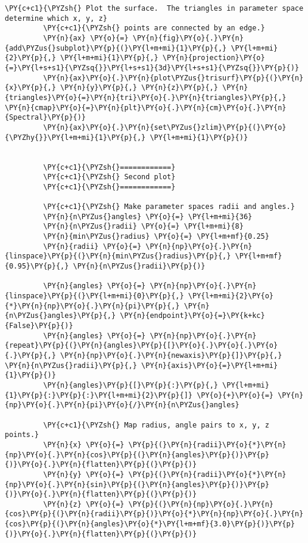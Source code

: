 \begin{Verbatim}[commandchars=\\\{\},frame=single,framerule=0.3mm,rulecolor=\color{cellframecolor}]
         \PY{c+c1}{\PYZsh{} Plot the surface.  The triangles in parameter space determine which x, y, z}
         \PY{c+c1}{\PYZsh{} points are connected by an edge.}
         \PY{n}{ax} \PY{o}{=} \PY{n}{fig}\PY{o}{.}\PY{n}{add\PYZus{}subplot}\PY{p}{(}\PY{l+m+mi}{1}\PY{p}{,} \PY{l+m+mi}{2}\PY{p}{,} \PY{l+m+mi}{1}\PY{p}{,} \PY{n}{projection}\PY{o}{=}\PY{l+s+s1}{\PYZsq{}}\PY{l+s+s1}{3d}\PY{l+s+s1}{\PYZsq{}}\PY{p}{)}
         \PY{n}{ax}\PY{o}{.}\PY{n}{plot\PYZus{}trisurf}\PY{p}{(}\PY{n}{x}\PY{p}{,} \PY{n}{y}\PY{p}{,} \PY{n}{z}\PY{p}{,} \PY{n}{triangles}\PY{o}{=}\PY{n}{tri}\PY{o}{.}\PY{n}{triangles}\PY{p}{,} \PY{n}{cmap}\PY{o}{=}\PY{n}{plt}\PY{o}{.}\PY{n}{cm}\PY{o}{.}\PY{n}{Spectral}\PY{p}{)}
         \PY{n}{ax}\PY{o}{.}\PY{n}{set\PYZus{}zlim}\PY{p}{(}\PY{o}{\PYZhy{}}\PY{l+m+mi}{1}\PY{p}{,} \PY{l+m+mi}{1}\PY{p}{)}
         
         
         \PY{c+c1}{\PYZsh{}============}
         \PY{c+c1}{\PYZsh{} Second plot}
         \PY{c+c1}{\PYZsh{}============}
         
         \PY{c+c1}{\PYZsh{} Make parameter spaces radii and angles.}
         \PY{n}{n\PYZus{}angles} \PY{o}{=} \PY{l+m+mi}{36}
         \PY{n}{n\PYZus{}radii} \PY{o}{=} \PY{l+m+mi}{8}
         \PY{n}{min\PYZus{}radius} \PY{o}{=} \PY{l+m+mf}{0.25}
         \PY{n}{radii} \PY{o}{=} \PY{n}{np}\PY{o}{.}\PY{n}{linspace}\PY{p}{(}\PY{n}{min\PYZus{}radius}\PY{p}{,} \PY{l+m+mf}{0.95}\PY{p}{,} \PY{n}{n\PYZus{}radii}\PY{p}{)}
         
         \PY{n}{angles} \PY{o}{=} \PY{n}{np}\PY{o}{.}\PY{n}{linspace}\PY{p}{(}\PY{l+m+mi}{0}\PY{p}{,} \PY{l+m+mi}{2}\PY{o}{*}\PY{n}{np}\PY{o}{.}\PY{n}{pi}\PY{p}{,} \PY{n}{n\PYZus{}angles}\PY{p}{,} \PY{n}{endpoint}\PY{o}{=}\PY{k+kc}{False}\PY{p}{)}
         \PY{n}{angles} \PY{o}{=} \PY{n}{np}\PY{o}{.}\PY{n}{repeat}\PY{p}{(}\PY{n}{angles}\PY{p}{[}\PY{o}{.}\PY{o}{.}\PY{o}{.}\PY{p}{,} \PY{n}{np}\PY{o}{.}\PY{n}{newaxis}\PY{p}{]}\PY{p}{,} \PY{n}{n\PYZus{}radii}\PY{p}{,} \PY{n}{axis}\PY{o}{=}\PY{l+m+mi}{1}\PY{p}{)}
         \PY{n}{angles}\PY{p}{[}\PY{p}{:}\PY{p}{,} \PY{l+m+mi}{1}\PY{p}{:}\PY{p}{:}\PY{l+m+mi}{2}\PY{p}{]} \PY{o}{+}\PY{o}{=} \PY{n}{np}\PY{o}{.}\PY{n}{pi}\PY{o}{/}\PY{n}{n\PYZus{}angles}
         
         \PY{c+c1}{\PYZsh{} Map radius, angle pairs to x, y, z points.}
         \PY{n}{x} \PY{o}{=} \PY{p}{(}\PY{n}{radii}\PY{o}{*}\PY{n}{np}\PY{o}{.}\PY{n}{cos}\PY{p}{(}\PY{n}{angles}\PY{p}{)}\PY{p}{)}\PY{o}{.}\PY{n}{flatten}\PY{p}{(}\PY{p}{)}
         \PY{n}{y} \PY{o}{=} \PY{p}{(}\PY{n}{radii}\PY{o}{*}\PY{n}{np}\PY{o}{.}\PY{n}{sin}\PY{p}{(}\PY{n}{angles}\PY{p}{)}\PY{p}{)}\PY{o}{.}\PY{n}{flatten}\PY{p}{(}\PY{p}{)}
         \PY{n}{z} \PY{o}{=} \PY{p}{(}\PY{n}{np}\PY{o}{.}\PY{n}{cos}\PY{p}{(}\PY{n}{radii}\PY{p}{)}\PY{o}{*}\PY{n}{np}\PY{o}{.}\PY{n}{cos}\PY{p}{(}\PY{n}{angles}\PY{o}{*}\PY{l+m+mf}{3.0}\PY{p}{)}\PY{p}{)}\PY{o}{.}\PY{n}{flatten}\PY{p}{(}\PY{p}{)}
         

\end{Verbatim}
